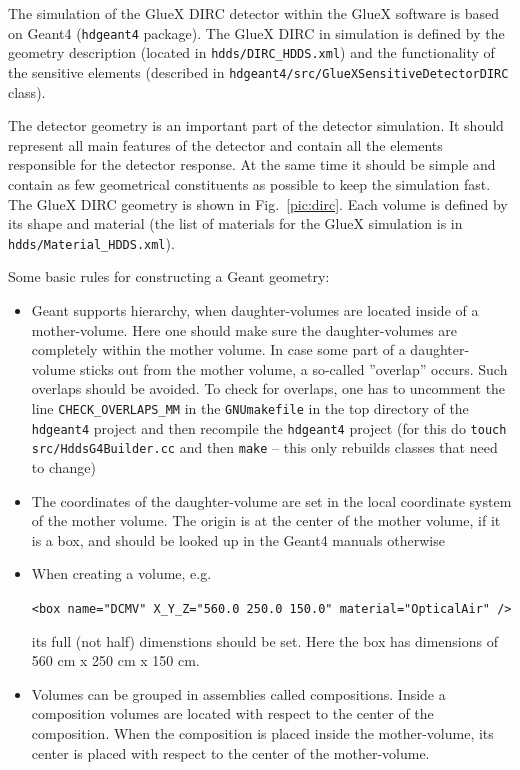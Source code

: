 \documentclass[11pt, a4paper]{article}
\begin{document}
The simulation of the GlueX DIRC detector within the GlueX software is based on Geant4 (\texttt{hdgeant4} package). The GlueX DIRC in simulation is defined by the geometry description (located in  \texttt{hdds/DIRC{\_}HDDS.xml}) and the functionality of the sensitive elements (described in \texttt{hdgeant4/src/GlueXSensitiveDetectorDIRC} class). 

The detector geometry is an important part of the detector simulation. It should represent all main features of the detector and contain all the elements responsible for the detector response. At the same time it should be simple and contain as few geometrical constituents as possible to keep the simulation fast. The GlueX DIRC geometry is shown in Fig.~\ref{pic:dirc}. Each volume is defined by its shape and material (the list of materials for the GlueX simulation is in \texttt{hdds/Material{\_}HDDS.xml}). 

\vspace{0.5cm}
Some basic rules for constructing a Geant geometry:
\begin{itemize}
\item Geant supports hierarchy, when daughter-volumes are located inside of a mother-volume.  Here one should make sure the daughter-volumes are completely within the mother volume. In case some part of a daughter-volume sticks out from the mother volume, a so-called ''overlap'' occurs. Such overlaps should be avoided. To check for overlaps, one has to uncomment the line \texttt{CHECK{\_}OVERLAPS{\_}MM} in the \texttt{GNUmakefile} in the top directory of the \texttt{hdgeant4} project and then recompile the \texttt{hdgeant4} project (for this do \texttt{touch src/HddsG4Builder.cc} and then \texttt{make} -- this only rebuilds classes that need to change)
\item The coordinates of the daughter-volume are set in the local coordinate system of the mother volume. The origin is at the center of the mother volume, if it is a box, and should be looked up in the Geant4 manuals otherwise
\item When creating a volume, e.g.
\begin{center}
 \texttt{<box name="DCMV" X{\_}Y{\_}Z="560.0 250.0 150.0" material="OpticalAir" />} 
\end{center}
\noindent its full (not half) dimenstions should be set. Here the box has dimensions of 560 cm x 250 cm x 150 cm.
\item Volumes can be grouped in assemblies called compositions. Inside a composition volumes are located with respect to the center of the composition. When the composition is placed inside the mother-volume, its center is placed with respect to the center of the mother-volume.
\end{itemize}
\end{document}
